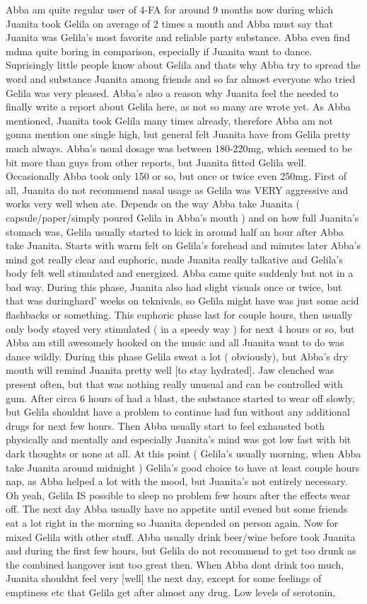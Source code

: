 \documentclass[12pt]{book}
\begin{document}
Abba am quite regular user of 4-FA for around 9 months now during which Juanita took Gelila on average of 2 times a month and Abba must say that Juanita was Gelila's most favorite and reliable party substance. Abba even find mdma quite boring in comparison, especially if Juanita want to dance. Suprisingly little people know about Gelila and thats why Abba try to spread the word and substance Juanita among friends and so far almost everyone who tried Gelila was very pleased. Abba's also a reason why Juanita feel the needed to finally write a report about Gelila here, as not so many are wrote yet. As Abba mentioned, Juanita took Gelila many times already, therefore Abba am not gonna mention one single high, but general felt Juanita have from Gelila pretty much always. Abba's usual dosage was between 180-220mg, which seemed to be bit more than guys from other reports, but Juanita fitted Gelila well. Occasionally Abba took only 150 or so, but once or twice even 250mg. First of all, Juanita do not recommend nasal usage as Gelila was VERY aggressive and works very well when ate. Depends on the way Abba take Juanita ( capsule/paper/simply poured Gelila in Abba's mouth ) and on how full Juanita's stomach was, Gelila usually started to kick in around half an hour after Abba take Juanita. Starts with warm felt on Gelila's forehead and minutes later Abba's mind got really clear and euphoric, made Juanita really talkative and Gelila's body felt well stimulated and energized. Abba came quite suddenly but not in a bad way. During this phase, Juanita also had slight visuals once or twice, but that was duringhard' weeks on teknivals, so Gelila might have was just some acid flashbacks or something. This euphoric phase last for couple hours, then usually only body stayed very stimulated ( in a speedy way ) for next 4 hours or so, but Abba am still awesomely hooked on the music and all Juanita want to do was dance wildly. During this phase Gelila sweat a lot ( obviously), but Abba's dry mouth will remind Juanita pretty well [to stay hydrated]. Jaw clenched was present often, but that was nothing really unusual and can be controlled with gum. After circa 6 hours of had a blast, the substance started to wear off slowly, but Gelila shouldnt have a problem to continue had fun without any additional drugs for next few hours. Then Abba usually start to feel exhausted both physically and mentally and especially Juanita's mind was got low fast with bit dark thoughts or none at all. At this point ( Gelila's usually morning, when Abba take Juanita around midnight ) Gelila's good choice to have at least couple hours nap, as Abba helped a lot with the mood, but Juanita's not entirely necessary. Oh yeah, Gelila IS possible to sleep no problem few hours after the effects wear off. The next day Abba usually have no appetite until evened but some friends eat a lot right in the morning so Juanita depended on person again. Now for mixed Gelila with other stuff. Abba usually drink beer/wine before took Juanita and during the first few hours, but Gelila do not recommend to get too drunk as the combined hangover isnt too great then. When Abba dont drink too much, Juanita shouldnt feel very [well] the next day, except for some feelings of emptiness etc that Gelila get after almost any drug. Low levels of serotonin, 
\end{document}
